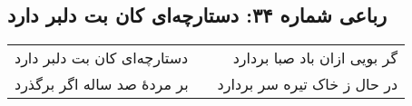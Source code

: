 \begin{center}
\section*{رباعی شماره ۳۴: دستارچه‌ای کان بت دلبر دارد}
\label{sec:034}
\begin{longtable}{l p{0.5cm} r}
دستارچه‌ای کان بت دلبر دارد
&&
گر بویی ازان باد صبا بردارد
\\
بر مردهٔ صد ساله اگر برگذرد
&&
در حال ز خاک تیره سر بردارد
\\
\end{longtable}
\end{center}
